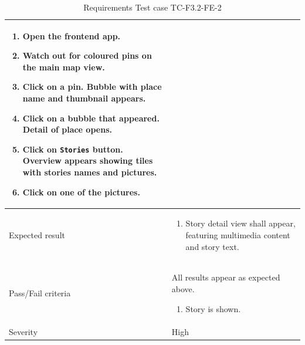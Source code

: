 \documentclass[11pt]{book}
\begin{document}
\begin{table}
\begin{tabular}{| p{3cm} | p{9.5cm} |}
                            \begin{enumerate}
                              \item Open the frontend app.
                              \item Watch out for coloured pins on the main map view.
                              \item Click on a pin. Bubble with place name and thumbnail appears.
                              \item Click on a bubble that appeared. Detail of place opens.
                              \item Click on \texttt{Stories} button. Overview appears showing tiles with stories names and pictures.
                              \item Click on one of the pictures.
                            \end{enumerate} \\ \hline 
    Expected result       & \begin{enumerate}
                              \item Story detail view shall appear, featuring multimedia content and story text.
                            \end{enumerate} \\ \hline 
    Pass/Fail criteria    & All results appear as expected above.
                            \begin{enumerate}
                              \item Story is shown.
                            \end{enumerate} \\ \hline 
    Severity              & High \\ \hline 
  \end{tabular}
  \caption{Requirements Test case TC-F3.2-FE-2}
  \label{tab:TCF3.2FE2}
\end{table}
\end{document}

